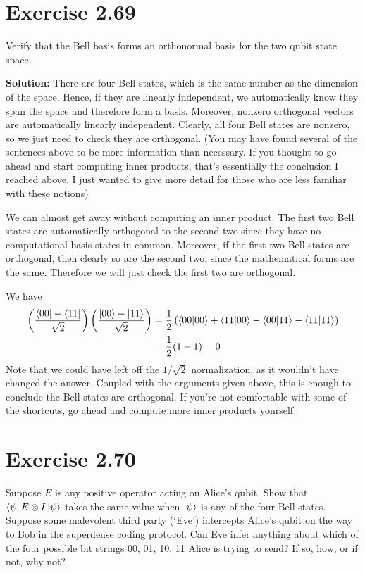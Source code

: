 \documentclass{book}
\begin{document}
\section*{Exercise 2.69}
    Verify that the Bell basis forms an orthonormal basis for the two qubit state space.

    \textbf{Solution:} There are four Bell states, which is the same number as the dimension of the space. Hence, if they are linearly independent, we automatically know they span the space and therefore form a basis. Moreover, nonzero orthogonal vectors are automatically linearly independent. Clearly, all four Bell states are nonzero, so we just need to check they are orthogonal. (You may have found several of the sentences above to be more information than necessary. If you thought to go ahead and start computing inner products, that's essentially the conclusion I reached above. I just wanted to give more detail for those who are less familiar with these notions)

    We can almost get away without computing an inner product. The first two Bell states are automatically orthogonal to the second two since they have no computational basis states in common. Moreover, if the first two Bell states are orthogonal, then clearly so are the second two, since the mathematical forms are the same. Therefore we will just check the first two are orthogonal.

    We have
    \begin{align}
    \begin{aligned}
        \left(\frac{\bra{00}+\bra{11}}{\sqrt{2}}\right) \left(\frac{\ket{00} - \ket{11}}{\sqrt{2}}\right) &= \frac{1}{2}\left(\braket{00}{00} + \braket{11}{00} - \braket{00}{11}-\braket{11}{11}\right) \\
        &=\frac{1}{2}(1 - 1) = 0
    \end{aligned}
    \end{align}
    Note that we could have left off the $1/\sqrt{2}$ normalization, as it wouldn't have changed the answer. Coupled with the arguments given above, this is enough to conclude the Bell states are orthogonal. If you're not comfortable with some of the shortcuts, go ahead and compute more inner products yourself!

\section*{Exercise 2.70}
    Suppose $E$ is any positive operator acting on Alice’s qubit. Show that $\bra{\psi} E \otimes I\ket{\psi}$ takes the same value when $\ket{\psi}$ is any of the four Bell states. Suppose some malevolent third party (‘Eve’) intercepts Alice’s qubit on the way to Bob in the superdense coding protocol. Can Eve infer anything about which of the four possible bit strings 00, 01, 10, 11 Alice is trying to send? If so, how, or if not, why not?
\end{document}
